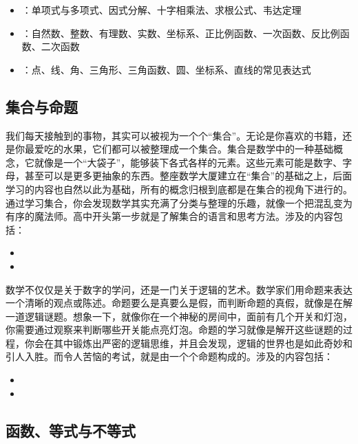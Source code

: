 \begin{itemize}
\item {}：单项式与多项式、因式分解、十字相乘法、求根公式、韦达定理
\item {}：自然数、整数、有理数、实数、坐标系、正比例函数、一次函数、反比例函数、二次函数
\item {}：点、线、角、三角形、三角函数、圆、坐标系、直线的常见表达式
\end{itemize}


\subsection{集合与命题}

我们每天接触到的事物，其实可以被视为一个个“集合”。无论是你喜欢的书籍，还是你最爱吃的水果，它们都可以被整理成一个集合。集合是数学中的一种基础概念，它就像是一个“大袋子”，能够装下各式各样的元素。这些元素可能是数字、字母，甚至可以是更多更抽象的东西。整座数学大厦建立在“集合”的基础之上，后面学习的内容也自然以此为基础，所有的概念归根到底都是在集合的视角下进行的。通过学习集合，你会发现数学其实充满了分类与整理的乐趣，就像一个把混乱变为有序的魔法师。高中开头第一步就是了解集合的语言和思考方法。涉及的内容包括：

\begin{itemize}
\item {}
\item {}
\end{itemize}

数学不仅仅是关于数字的学问，还是一门关于逻辑的艺术。数学家们用命题来表达一个清晰的观点或陈述。命题要么是真要么是假，而判断命题的真假，就像是在解一道逻辑谜题。想象一下，就像你在一个神秘的房间中，面前有几个开关和灯泡，你需要通过观察来判断哪些开关能点亮灯泡。命题的学习就像是解开这些谜题的过程，你会在其中锻炼出严密的逻辑思维，并且会发现，逻辑的世界也是如此奇妙和引人入胜。而令人苦恼的考试，就是由一个个命题构成的。涉及的内容包括：
\begin{itemize}
\item {}
\item {}
\end{itemize}

\subsection{函数、等式与不等式}

